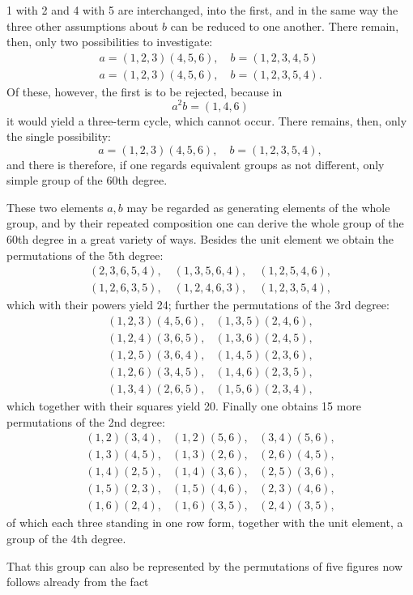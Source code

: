 1 with 2 and 4 with 5 are interchanged, into the first, and in the same way the three other assumptions about $b$ can be reduced to one another. There remain, then, only two possibilities to investigate:
\[
\begin{gathered}
a = (1, 2, 3) (4, 5, 6), \quad b = (1, 2, 3, 4, 5) \\
a = (1, 2, 3) (4, 5, 6), \quad b = (1, 2, 3, 5, 4).
\end{gathered}
\]
Of these, however, the first is to be rejected, because in
\[
a^2 b = (1, 4, 6)
\]
it would yield a three-term cycle, which cannot occur. There remains, then, only the single possibility:
\[
a = (1, 2, 3) (4, 5, 6), \quad b = (1, 2, 3, 5, 4),
\]
and there is therefore, if one regards equivalent groups as not different, only  simple group of the 60th degree.

These two elements $a, b$ may be regarded as generating elements of the whole group, and by their repeated composition one can derive the whole group of the 60th degree in a great variety of ways. Besides the unit element we obtain the permutations of the 5th degree:
\[
\begin{gathered}
(2, 3, 6, 5, 4), \quad (1, 3, 5, 6, 4), \quad (1, 2, 5, 4, 6), \\
(1, 2, 6, 3, 5), \quad (1, 2, 4, 6, 3), \quad (1, 2, 3, 5, 4),
\end{gathered}
\]
which with their powers yield 24; further the permutations of the 3rd degree:
\[
\begin{array}{ll}
(1, 2, 3) (4, 5, 6), & (1, 3, 5) (2, 4, 6), \\
(1, 2, 4) (3, 6, 5), & (1, 3, 6) (2, 4, 5), \\
(1, 2, 5) (3, 6, 4), & (1, 4, 5) (2, 3, 6), \\
(1, 2, 6) (3, 4, 5), & (1, 4, 6) (2, 3, 5), \\
(1, 3, 4) (2, 6, 5), & (1, 5, 6) (2, 3, 4),
\end{array}
\]
which together with their squares yield 20. Finally one obtains 15 more permutations of the 2nd degree:
\[
\begin{array}{lll}
(1, 2) (3, 4), & (1, 2) (5, 6), & (3, 4) (5, 6), \\
(1, 3) (4, 5), & (1, 3) (2, 6), & (2, 6) (4, 5), \\
(1, 4) (2, 5), & (1, 4) (3, 6), & (2, 5) (3, 6), \\
(1, 5) (2, 3), & (1, 5) (4, 6), & (2, 3) (4, 6), \\
(1, 6) (2, 4), & (1, 6) (3, 5), & (2, 4) (3, 5),
\end{array}
\]
of which each three standing in one row form, together with the unit element, a group of the 4th degree.

That this group can also be represented by the permutations of five figures now follows already from the fact
